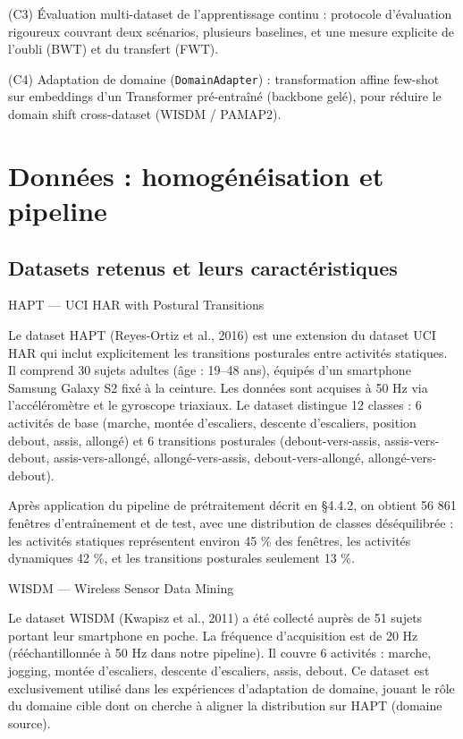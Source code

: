 (C3) Évaluation multi-dataset de l'apprentissage continu : protocole d'évaluation rigoureux couvrant deux scénarios, plusieurs baselines, et une mesure explicite de l'oubli (BWT) et du transfert (FWT).

(C4) Adaptation de domaine (\texttt{DomainAdapter}) : transformation affine few-shot sur embeddings d'un Transformer pré-entraîné (backbone gelé), pour réduire le domain shift cross-dataset (WISDM / PAMAP2).

\section{Données : homogénéisation et pipeline}

\subsection{Datasets retenus et leurs caractéristiques}

HAPT — UCI HAR with Postural Transitions

Le dataset HAPT (Reyes-Ortiz et al., 2016) est une extension du dataset UCI HAR qui inclut explicitement les transitions posturales entre activités statiques. Il comprend 30 sujets adultes (âge : 19–48 ans), équipés d'un smartphone Samsung Galaxy S2 fixé à la ceinture. Les données sont acquises à 50 Hz via l'accéléromètre et le gyroscope triaxiaux. Le dataset distingue 12 classes : 6 activités de base (marche, montée d'escaliers, descente d'escaliers, position debout, assis, allongé) et 6 transitions posturales (debout-vers-assis, assis-vers-debout, assis-vers-allongé, allongé-vers-assis, debout-vers-allongé, allongé-vers-debout).

Après application du pipeline de prétraitement décrit en §4.4.2, on obtient 56 861 fenêtres d'entraînement et de test, avec une distribution de classes déséquilibrée : les activités statiques représentent environ 45 \% des fenêtres, les activités dynamiques 42 \%, et les transitions posturales seulement 13 \%.

WISDM — Wireless Sensor Data Mining

Le dataset WISDM (Kwapisz et al., 2011) a été collecté auprès de 51 sujets portant leur smartphone en poche. La fréquence d'acquisition est de 20 Hz (rééchantillonnée à 50 Hz dans notre pipeline). Il couvre 6 activités : marche, jogging, montée d'escaliers, descente d'escaliers, assis, debout. Ce dataset est exclusivement utilisé dans les expériences d'adaptation de domaine, jouant le rôle du domaine cible dont on cherche à aligner la distribution sur HAPT (domaine source).

